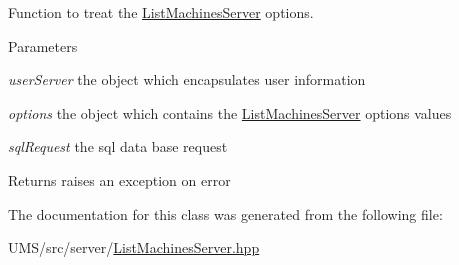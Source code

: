 Function to treat the \hyperlink{classListMachinesServer}{ListMachinesServer} options. 


\begin{DoxyParams}{Parameters}
\item[{\em userServer}]the object which encapsulates user information \item[{\em options}]the object which contains the \hyperlink{classListMachinesServer}{ListMachinesServer} options values \item[{\em sqlRequest}]the sql data base request \end{DoxyParams}
\begin{DoxyReturn}{Returns}
raises an exception on error 
\end{DoxyReturn}


The documentation for this class was generated from the following file:\begin{DoxyCompactItemize}
\item 
UMS/src/server/\hyperlink{ListMachinesServer_8hpp}{ListMachinesServer.hpp}\end{DoxyCompactItemize}
